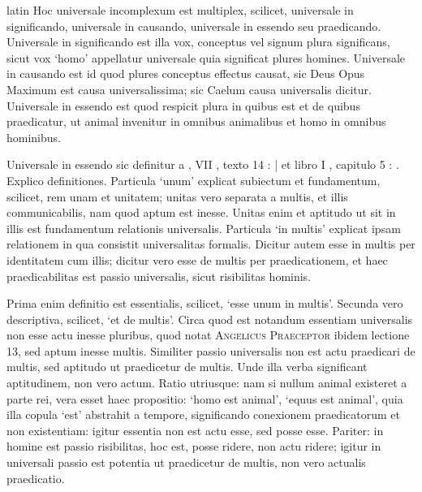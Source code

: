 \begin{otherlanguage*}{latin}
\pstart
 Hoc universale incomplexum est multiplex, scilicet, universale in significando, universale in causando, universale in essendo seu praedicando. Universale in significando est illa vox, conceptus vel signum plura significans, sicut vox `homo' appellatur universale quia significat plures homines. Universale in causando est id quod plures conceptus effectus causat, sic Deus Opus Maximum est causa universalissima; sic Caelum causa universalis dicitur. Universale in essendo est quod respicit plura in quibus est et de quibus praedicatur, ut animal invenitur in omnibus animalibus et homo in omnibus hominibus. 
\pend

\pstart
 Universale in essendo sic definitur a  , VII , texto 14 :  \textnormal{|}   et  libro I , capitulo 5 : . Explico definitiones. Particula `unum' explicat subiectum et fundamentum, scilicet, rem unam et unitatem; unitas vero separata a multis, et illis communicabilis, nam quod aptum est inesse. Unitas enim et aptitudo ut sit in illis est fundamentum relationis universalis. Particula `in multis' explicat ipsam relationem in qua consistit universalitas formalis. Dicitur autem esse in multis per identitatem cum illis; dicitur vero esse de multis per praedicationem, et haec praedicabilitas est passio universalis, sicut risibilitas hominis. 
\pend

\pstart
 Prima enim definitio est essentialis, scilicet, `esse unum in multis'. Secunda vero descriptiva, scilicet, `et de multis'. Circa quod est notandum essentiam universalis non esse actu inesse pluribus, quod notat \textsc{Angelicus Praeceptor} ibidem lectione 13, sed aptum inesse multis. Similiter passio universalis non est actu praedicari de multis, sed aptitudo ut praedicetur de multis. Unde illa verba significant aptitudinem, non vero actum. Ratio utriusque: nam si nullum animal existeret a parte rei, vera esset haec propositio: `homo est animal', `equus est animal', quia illa copula `est' abstrahit a tempore, significando conexionem praedicatorum et non existentiam: igitur essentia non est actu esse, sed posse esse. Pariter: in homine est passio risibilitas, hoc est, posse ridere, non actu ridere; igitur in universali passio est potentia ut praedicetur de multis, non vero actualis praedicatio. 
\pend


\end{otherlanguage*}
